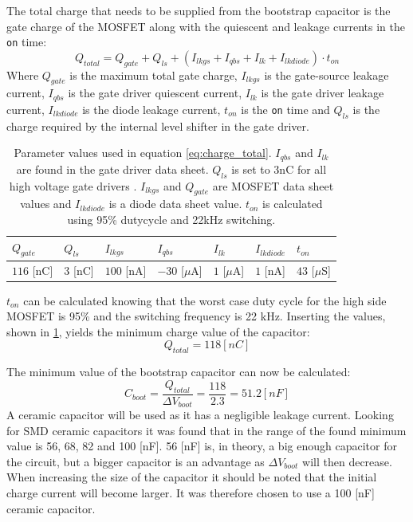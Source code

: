 The total charge that needs to be supplied from the bootstrap capacitor is the gate charge of the MOSFET along with the quiescent and leakage currents in the \texttt{on} time:
\begin{equation}
	Q_{total} = Q_{gate} + Q_{ls} + (I_{lkgs} + I_{qbs} + I_{lk} + I_{lkdiode}) \cdot t_{on}
	\label{eq:charge_total}
\end{equation}
Where $Q_{gate}$ is the maximum total gate charge, $I_{lkgs}$ is the gate-source leakage current, $I_{qbs}$ is the gate driver quiescent current, $I_{lk}$ is the gate driver leakage current, $I_{lkdiode}$ is the diode leakage current, $ t_{on}$ is the \texttt{on} time and $Q_{ls}$ is the charge required by the internal level shifter in the gate driver.
\begin{table}[h]
\centering
\begin{tabular}{|l|l|l|l|l|l|l|}
 \hline
 $Q_{gate}$ 	& $Q_{ls}$ 	& $I_{lkgs}$ 	& $I_{qbs}$ 		& $I_{lk}$ 			& $I_{lkdiode}$ 	& $t_{on}$ 		\\ 	\hline
 $116$ [nC]		& $3$ [nC]	& $100$ [nA]	&$-30$ [$\mu$A]		& $1$ [$\mu$A]		& $1$ [nA]			& $43$ [$\mu$S]	\\ 	\hline
\end{tabular}
\caption[Parameter values used to determine total charge.]{Parameter values used in equation \ref{eq:charge_total}. $I_{qbs}$ and $I_{lk}$ are found in the gate driver data sheet. $Q_{ls}$ is set to 3nC for all high voltage gate drivers \cite{bootstrap_ON}. $I_{lkgs}$ and $Q_{gate}$ are MOSFET data sheet values and $I_{lkdiode}$  is a diode data sheet value. $t_{on}$ is calculated using 95\% dutycycle and 22kHz switching.}
\label{tab:bootstrap_parameter}
\end{table}
$t_{on}$ can be calculated knowing that the worst case duty cycle for the high side MOSFET is 95\% and the switching frequency is 22 kHz.
Inserting the values, shown in \ref{tab:bootstrap_parameter}, yields the minimum charge value of the capacitor:
\begin{equation}
	Q_{total} = 118 [nC]
\end{equation}

The minimum value of the bootstrap capacitor can now be calculated:
\begin{equation}
	C_{boot} = \frac{Q_{total}}{\Delta V_{boot}} = \frac{118}{2.3} = 51.2 [nF]
\end{equation}
A ceramic capacitor will be used as it has a negligible leakage current. 
Looking for SMD ceramic capacitors it was found that in the range of the found minimum value is 56, 68, 82 and 100 [nF].
56 [nF] is, in theory, a big enough capacitor for the circuit, but a bigger capacitor is an advantage as $\Delta V_{boot}$ will then decrease.
When increasing the size of the capacitor it should be noted that the initial charge current will become larger.
It was therefore chosen to use a 100 [nF] ceramic capacitor.

